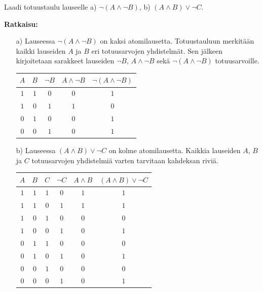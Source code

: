 \begin{esimerkki}
Laadi totuustaulu lauseelle a) $\lnot(A\land \lnot B)$, b) $(A\land B)\lor \lnot C$.

{\bf Ratkaisu:}
\begin{itemize}
\item[a)] Lauseessa $\lnot(A\land \lnot B)$ on kaksi atomilausetta. Totuustauluun merkitään kaikki lauseiden $A$ ja $B$ eri totuusarvojen yhdistelmät. Sen jälkeen kirjoitetaan sarakkeet lauseiden $\lnot B$, $A\land \lnot B$ sekä $\lnot(A\land \lnot B)$  totuusarvoille.
\bigskip

\begin{center}
\begin{tabular}{|c|c|c|c|c|}\hline
$A$ & $B$ & $\lnot B$ & $A\land \lnot B$ & $\lnot(A\land \lnot B)$ \\ \hline
$1$ & $1$ & $0$       & $0$ & $1$ \\ 
$1$ & $0$ & $1$       & $1$ & $0$ \\
$0$ & $1$ & $0$       & $0$ & $1$ \\
$0$ & $0$ & $1$       & $0$ & $1$ \\ \hline
\end{tabular}
\end{center}

\bigskip

\item[b)] Lauseessa $(A\land B)\lor \lnot C$ on kolme atomilausetta. Kaikkia lauseiden $A$, $B$ ja $C$ totuusarvojen yhdistelmiä varten tarvitaan kahdeksan riviä.

\bigskip

\begin{center}
\begin{tabular}{|c|c|c|c|c|c|}\hline
$A$ & $B$ & $C$ & $\lnot C$ & $A\land B$ & $(A\land B)\lor \lnot C$\\ \hline
$1$ & $1$ & $1$ & $0$ & $1$ & $1$ \\ %
$1$ & $1$ & $0$ & $1$ & $1$ & $1$ \\
$1$ & $0$ & $1$ & $0$ & $0$ & $0$ \\
$1$ & $0$ & $0$ & $1$ & $0$ & $1$ \\
$0$ & $1$ & $1$ & $0$ & $0$ & $0$ \\
$0$ & $1$ & $0$ & $1$ & $0$ & $1$ \\
$0$ & $0$ & $1$ & $0$ & $0$ & $0$ \\
$0$ & $0$ & $0$ & $1$ & $0$ & $1$ \\ \hline
\end{tabular}
\end{center}

\end{itemize}
\end{esimerkki}


